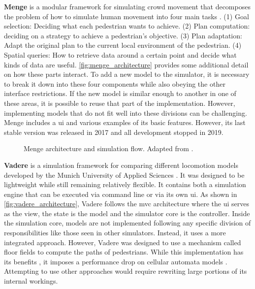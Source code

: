 \documentclass[twoside, 11pt]{article}
\begin{document}
\textbf{Menge} is a modular framework for simulating crowd movement that decomposes the problem of how to simulate human movement into four main tasks \cite{curtisMengeModularFramework2016}. (1) Goal selection: Deciding what each pedestrian wants to achieve. (2) Plan computation: deciding on a strategy to achieve a pedestrian's objective. (3) Plan adaptation: Adapt the original plan to the current local environment of the pedestrian. (4) Spatial queries: How to retrieve data around a certain point and decide what kinds of data are useful. \autoref{fig:menge_architecture} provides some additional detail on how these parts interact. To add a new model to the simulator, it is necessary to break it down into these four components while also obeying the other interface restrictions. If the new model is similar enough to another in one of these areas, it is possible to reuse that part of the implementation. However, implementing models that do not fit well into these divisions can be challenging. Menge includes a \gls{ui} and various examples of its basic features. However, its last stable version was released in 2017 and all development stopped in 2019.

\begin{figure}[h]
  \centering
  
  \caption[Menge architecture and simulation flow]{Menge architecture and simulation flow. Adapted from \cite{curtisMengeModularFramework2016}.}
  \label{fig:menge_architecture}
\end{figure}


\textbf{Vadere} is a simulation framework for comparing different locomotion models developed by the Munich University of Applied Sciences \cite{kleinmeierVadereOpenSourceSimulation2019}. It was designed to be lightweight while still remaining relatively flexible. It contains both a simulation engine that can be executed via command line or via its own \gls{ui}. As shown in \autoref{fig:vadere_architecture}, Vadere follows the \gls{mvc} architecture where the \gls{ui} serves as the view, the state is the model and the simulator core is the controller. Inside the simulation core, models are not implemented following any specific division of responsibilities like those seen in other simulators. Instead, it uses a more integrated approach. However, Vadere was designed to use a mechanism called floor fields to compute the paths of pedestrians. While this implementation has its benefits \cite{seitzSuperpositionPrincipleConceptual2016}, it imposes a performance drop on cellular automata models \cite{kleinmeierVadereOpenSourceSimulation2019}. Attempting to use other approaches would require rewriting large portions of its internal workings.
\end{document}
